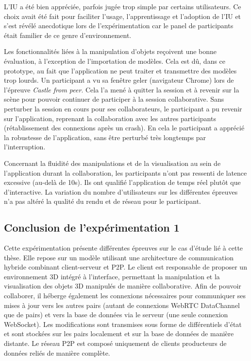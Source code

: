 L'\gls{IU} a été bien appréciée, parfois jugée \og trop simple\fg{} par certains 
utilisateurs. Ce choix avait été fait pour faciliter l'usage, l'apprentissage et 
l'adoption de l'\gls{IU} et s'est révélé anecdotique lors de l'expérimentation car le 
panel de participants était familier de ce genre 
d'environnement.

Les fonctionnalités liées à la manipulation d'objets reçoivent une bonne évaluation, 
à l'exception de l'importation de modèles. Cela est dû, dans ce prototype, au 
fait que l'application ne peut traiter et transmettre des modèles trop lourds. Un 
participant a vu sa fenêtre \og geler\fg{} (navigateur Chrome) lors de l'épreuve 
\textit{Castle from peer}. Cela l'a mené à quitter la session et à revenir sur la 
scène pour pouvoir continuer de participer à la session collaborative. Sans 
perturber la session en cours pour ses collaborateurs, le participant a pu revenir sur 
l'application, reprenant la collaboration avec les autres participants (rétablissement 
des connexions après un crash). En cela le participant a apprécié la robustesse de 
l'application, sans être perturbé très longtemps par l'interruption.

Concernant la fluidité des manipulations et de la visualisation au sein de 
l'application durant la collaboration, les participants n'ont pas ressenti de latence 
excessive (au-delà de 10s). Ils ont qualifié l'application de \og temps réel\fg{} plutôt 
que d'\og interactive\fg{}. La variation du nombre d'utilisateurs sur les différentes 
épreuves n'a pas altéré la qualité du rendu et de réseau pour le participant.

\subsection{Conclusion de l'expérimentation 1}


Cette expérimentation présente différentes épreuves sur le cas d'étude lié à cette 
thèse. Elle repose sur un modèle utilisant une architecture de communication 
hybride combinant client-serveur et \gls{P2P}. Le client est responsable de 
proposer un environnement \gls{3D} intégré à l'interface, permettant la 
manipulation et la visualisation des objets \gls{3D} manipulés de manière 
collaborative. Afin de pouvoir collaborer, il héberge également les connexions 
nécessaires pour communiquer ses mises à jour vers les autres pairs 
(autant de connexions WebRTC DataChannel que de pairs) et vers la base de données
via le serveur (une seule connexion WebSocket). Les modifications sont transmises
sous forme de différentiels d'état et sont stockées sur les pairs localement et 
sur la base de données de manière distante. 
Le réseau \gls{P2P} est composé uniquement de clients producteurs de 
données reliés de manière complète. 

